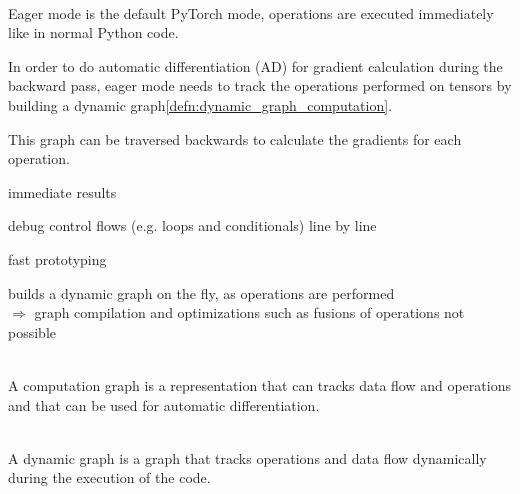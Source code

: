 \begin{defnbox}\nospacing
    \begin{defn}\label{defn:eager_mode}\leavevmode\\
        Eager mode is the default PyTorch mode, operations are executed immediately like in normal Python code.

        In order to do automatic differentiation (AD) for gradient calculation during the backward pass, eager mode needs to track the operations performed on tensors
        by building a dynamic graph\cref{defn:dynamic_graph_computation}.

        This graph can be traversed backwards to calculate the gradients for each operation.
    \end{defn}
\end{defnbox}
\begin{sectionbox}\nospacing
   \begin{proslist}
       \item {} immediate results
       \item debug control flows (e.g. loops and conditionals) line by line
       \item fast prototyping
   \end{proslist}
   \begin{conslist}
       \item builds a dynamic graph on the fly, as operations are performed\\
        $\Rightarrow$ graph compilation and optimizations such as fusions of operations not possible
   \end{conslist}
\end{sectionbox}
\begin{defnbox}\nospacing
    \begin{defn}\label{defn:computation_graph}\leavevmode\\
        A computation graph is a representation that can tracks data flow and operations and that can be used for automatic differentiation.
    \end{defn}
\end{defnbox}
\begin{defnbox}\nospacing
    \begin{defn}\label{defn:dynamic_graph_computation}\leavevmode\\
        A dynamic graph is a graph that tracks operations and data flow dynamically during the execution of the code.
    \end{defn}
\end{defnbox}

